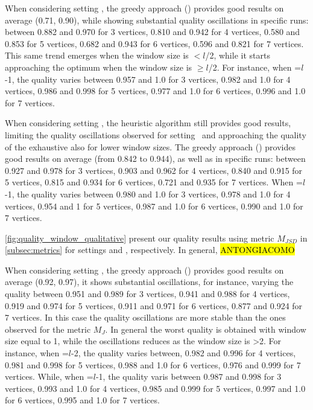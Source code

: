   When considering setting \wide, the greedy approach () provides good results on average (0.71, 0.90), while showing substantial quality oscillations in specific runs: between 0.882 and 0.970 for 3 vertices, 0.810 and 0.942 for 4 vertices, 0.580 and 0.853 for 5 vertices, 0.682 and 0.943 for 6 vertices, 0.596 and 0.821 for 7 vertices. This same trend emerges when the window size is $<$$l$/2, while it starts approaching the optimum when the window size is $\geq$$l$/2. For instance, when \windowsize=$l$-1, the quality varies between 0.957 and 1.0 for 3 vertices, 0.982 and 1.0 for 4 vertices, 0.986 and 0.998 for 5 vertices, 0.977 and 1.0 for 6 vertices, 0.996 and 1.0 for 7 vertices.

  When considering setting \average, the heuristic algorithm still provides good results, limiting the quality oscillations observed for setting \wide\ and approaching the quality of the exhaustive also for lower window sizes. The greedy approach () provides good results on average (from 0.842 to 0.944), as well as in specific runs: between 0.927 and 0.978 for 3 vertices, 0.903 and 0.962 for 4 vertices, 0.840 and 0.915 for 5 vertices, 0.815 and 0.934 for 6 vertices, 0.721 and 0.935 for 7 vertices.
  When \windowsize=$l$-1, the quality varies between 0.980 and 1.0 for 3 vertices, 0.978 and 1.0 for 4 vertices, 0.954 and 1 for 5 vertices, 0.987 and 1.0 for 6 vertices, 0.990 and 1.0 for 7 vertices.


  \cref{fig:quality_window_qualitative} present our quality results using metric $M_{JSD}$ in \cref{subsec:metrics} for settings \wide and \average, respectively.
  In general, \hl{ANTONGIACOMO}

  When considering setting \wide, the greedy approach () provides good results on average (0.92, 0.97), it shows substantial oscillations, for instance, varying the quality between 0.951 and 0.989 for 3 vertices, 0.941 and 0.988 for 4 vertices, 0.919 and 0.974 for 5 vertices, 0.911 and 0.971 for 6 vertices, 0.877 and 0.924 for 7 vertices. In this case the quality oscillations are more stable than the ones observed for the metric $M_J$.
  In general the worst quality is obtained with window size equal to 1, while the oscillations reduces as the window size is >2. For instance, when \windowsize=$l$-2, the quality varies between, 0.982 and 0.996 for 4 vertices, 0.981 and 0.998 for 5 vertices, 0.988 and 1.0 for 6 vertices, 0.976 and 0.999 for 7 vertices.
 While, when \windowsize=$l$-1, the quality varis between  0.987 and  0.998 for 3 vertices, 0.993 and 1.0 for 4 vertices, 0.985 and 0.999 for 5 vertices, 0.997 and 1.0 for 6 vertices, 0.995 and 1.0  for 7 vertices.


